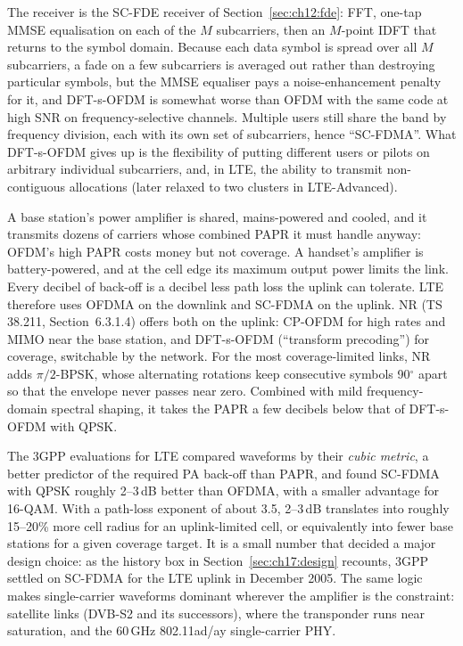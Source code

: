 The receiver is the SC-FDE receiver of Section~\ref{sec:ch12:fde}: FFT, one-tap MMSE equalisation on each of the
$M$ subcarriers, then an $M$-point IDFT that returns to the symbol domain. Because each data symbol is spread over
all $M$ subcarriers, a fade on a few subcarriers is averaged out rather than destroying particular symbols, but
the MMSE equaliser pays a noise-enhancement penalty for it, and DFT-s-OFDM is somewhat worse than OFDM with the
same code at high SNR on frequency-selective channels. Multiple users still share the band by frequency division,
each with its own set of subcarriers, hence ``SC-FDMA''. What DFT-s-OFDM gives up is the flexibility of
putting different users or pilots on arbitrary individual subcarriers, and, in LTE, the ability to transmit
non-contiguous allocations (later relaxed to two clusters in LTE-Advanced).

\begin{keyidea}
A base station's power amplifier is shared, mains-powered and cooled, and it transmits dozens of carriers whose
combined PAPR it must handle anyway: OFDM's high PAPR costs money but not coverage. A handset's amplifier is
battery-powered, and at the cell edge its maximum output power limits the link. Every decibel of back-off is a
decibel less path loss the uplink can tolerate. LTE therefore uses OFDMA on the downlink and SC-FDMA on the uplink.
NR (TS 38.211, Section~6.3.1.4) offers both on the uplink: CP-OFDM for high rates and MIMO near the base station,
and DFT-s-OFDM (``transform precoding'') for coverage, switchable by the network. For the most
coverage-limited links, NR adds $\pi/2$-BPSK, whose alternating rotations keep consecutive symbols 90$^\circ$
apart so that the envelope never passes near zero. Combined with mild frequency-domain spectral shaping, it
takes the PAPR a few decibels below that of DFT-s-OFDM with QPSK.
\end{keyidea}


\begin{inpractice}
The 3GPP evaluations for LTE compared waveforms by their \emph{cubic metric}, a better predictor of the
required PA back-off than PAPR, and found SC-FDMA with QPSK roughly 2--3\,dB better than OFDMA, with a
smaller advantage for 16-QAM. With a path-loss exponent of about 3.5, 2--3\,dB translates into roughly
15--20\% more cell radius for an uplink-limited cell, or equivalently into fewer base stations for a given
coverage target. It is a small number that decided a major design choice: as the history box in
Section~\ref{sec:ch17:design} recounts, 3GPP settled on SC-FDMA for the LTE uplink in December 2005.
The same logic makes single-carrier waveforms dominant wherever the amplifier is the constraint:
satellite links (DVB-S2 and its successors), where the transponder runs near saturation, and the
60\,GHz 802.11ad/ay single-carrier PHY.
\end{inpractice}

